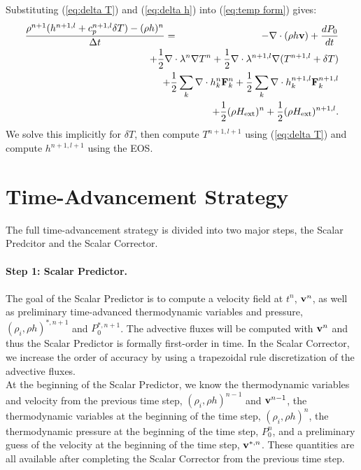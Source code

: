 \documentclass[final]{siamltex}
\def\Fb {{\bf F}}
\def\vb {{\bf v}}
\def\Hext {H_{\rm ext}}
\def\half   {\frac{1}{2}}
\begin{document}
Substituting (\ref{eq:delta T}) and (\ref{eq:delta h}) into (\ref{eq:temp form}) gives:
\begin{eqnarray}
\frac{\rho^{n+1}(h^{n+1,l} + c_p^{n+1,l}\delta T) - (\rho h)^n}{\Delta t} &=& -\nabla\cdot(\rho h\vb) + \frac{dP_0}{dt}\nonumber\\
&&\hspace{-0.5in}+ \half\nabla\cdot\lambda^n\nabla T^n + \half\nabla\cdot\lambda^{n+1,l}\nabla(T^{n+1,l} + \delta T)\nonumber\\
&&\hspace{-0.5in} + \half\sum_k\nabla\cdot h_k^n \Fb_k^n + \half\sum_k\nabla\cdot h_k^{n+1,l} \Fb_k^{n+1,l}\nonumber\\
&&\hspace{-0.5in} + \half(\rho\Hext)^n + \half(\rho\Hext)^{n+1,l}.
\end{eqnarray}
We solve this implicitly for $\delta T$, then compute $T^{n+1,l+1}$
using (\ref{eq:delta T}) and compute $h^{n+1,l+1}$ using the EOS.

\section{Time-Advancement Strategy}\label{Sec:Time-Advancement Strategy}
The full time-advancement strategy is divided into two major steps, the Scalar Predcitor
and the Scalar Corrector.\\ \\
{\bf Step 1: Scalar Predictor.}\\ \\
The goal of the Scalar Predictor is to compute a velocity field at $t^n$, $\vb^n$,
as well as preliminary time-advanced thermodynamic variables and pressure,
$(\rho_i,\rho h)^{*,n+1}$ and $P_0^{*,n+1}$.  The advective fluxes will be computed
with $\vb^n$ and thus the Scalar Predictor is formally first-order in time.
In the Scalar Corrector, we increase the order of accuracy by using a trapezoidal
rule discretization of the advective fluxes.\\

At the beginning of the Scalar Predictor, we know the thermodynamic variables and 
velocity from the previous time step, $(\rho_i,\rho h)^{n-1}$ and $\vb^{n-1}$, the 
thermodynamic variables at the beginning of the time step, $(\rho_i,\rho h)^n$, the
thermodynamic pressure at the beginning of the time step, $P_0^n$, and a preliminary
guess of the velocity at the beginning of the time step, $\vb^{*,n}$.  These quantities
are all available after completing the Scalar Corrector from the previous time step.\\
\end{document}
